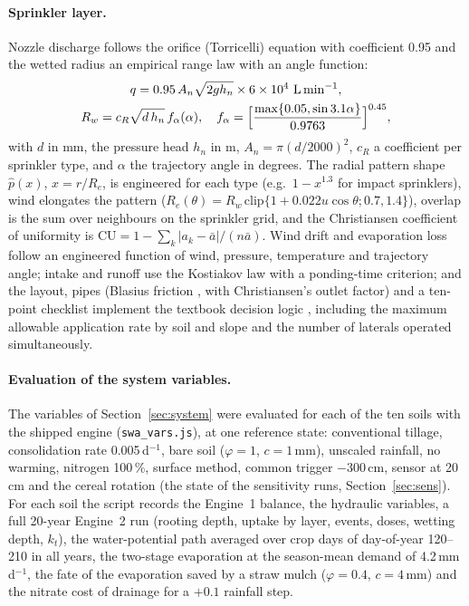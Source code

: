 \paragraph{Sprinkler layer.}
\label{sec:sprk}
Nozzle discharge follows the orifice (Torricelli) equation with coefficient 0.95 and the wetted radius an empirical range law \citep{Keller1990} with an angle function:
\begin{equation}
\begin{gathered}q=0.95\,A_n\sqrt{2gh_n}\times6\times10^4\ \mathrm{L\,min^{-1}},\\ R_w=c_R\sqrt{d\,h_n}\,f_\alpha(\alpha),\quad f_\alpha=\Bigl[\frac{\max\{0.05,\sin3.1\alpha\}}{0.9763}\Bigr]^{0.45},\end{gathered}
\label{eq:nozzle}
\end{equation}
with $d$ in mm, the pressure head $h_n$ in m, $A_n=\pi(d/2000)^2$, $c_R$ a coefficient per sprinkler type, and $\alpha$ the trajectory angle in degrees. The radial pattern shape $\hat p(x)$, $x=r/R_e$, is engineered for each type (e.g.\ $1-x^{1.3}$ for impact sprinklers), wind elongates the pattern ($R_e(\theta)=R_w\,\mathrm{clip}\{1+0.022u\cos\theta;0.7,1.4\}$), overlap is the sum over neighbours on the sprinkler grid, and the Christiansen coefficient of uniformity \citep{Christiansen1942} is $\mathrm{CU}=1-\sum_k|a_k-\bar a|/(n\bar a)$. Wind drift and evaporation loss follow an engineered function of wind, pressure, temperature and trajectory angle; intake and runoff use the Kostiakov law with a ponding-time criterion; and the layout, pipes (Blasius friction \citep{Blasius1913}, with Christiansen's outlet factor) and a ten-point checklist implement the textbook decision logic \citep{Keller1990}, including the maximum allowable application rate by soil and slope and the number of laterals operated simultaneously.

\paragraph{Evaluation of the system variables.}
\label{sec:swamethods}
The variables of Section~\ref{sec:system} were evaluated for each of the ten soils with the shipped engine (\texttt{swa\_vars.js}), at one reference state: conventional tillage, consolidation rate 0.005\,d$^{-1}$, bare soil ($\varphi=1$, $c=1$\,mm), unscaled rainfall, no warming, nitrogen 100\,\%, surface method, common trigger $-300$\,cm, sensor at 20\,cm and the cereal rotation (the state of the sensitivity runs, Section~\ref{sec:sens}). For each soil the script records the Engine~1 balance, the hydraulic variables, a full 20-year Engine~2 run (rooting depth, uptake by layer, events, doses, wetting depth, $k_t$), the water-potential path averaged over crop days of day-of-year 120--210 in all years, the two-stage evaporation at the season-mean demand of 4.2\,mm\,d$^{-1}$, the fate of the evaporation saved by a straw mulch ($\varphi=0.4$, $c=4$\,mm) and the nitrate cost of drainage for a $+0.1$ rainfall step.

